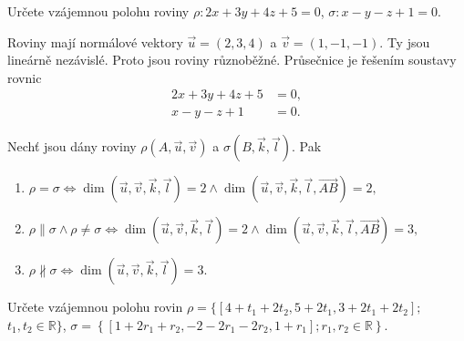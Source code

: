 \begin{priklad}
Určete vzájemnou polohu roviny $\rho\colon 2x+3y+4z+5=0$, $\sigma\colon x-y-z+1=0$.
\end{priklad}

\begin{reseni}
Roviny mají normálové vektory $\vec u = (2,3,4)$ a $\vec v = (1,-1,-1)$. Ty jsou lineárně nezávislé.
Proto jsou roviny různoběžné. Průsečnice je řešením soustavy rovnic
\begin{align*}
    2x+3y+4z+5& =0,\\
    x-y-z+1&=0.
\end{align*}
\end{reseni}

\begin{veta}
    Nechť jsou dány roviny $\rho(A,\vec u, \vec v)$ a $\sigma(B,\vec k, \vec l)$. Pak
    \begin{enumerate}[$i.$]
    \item $\rho = \sigma \iff \dim (\vec u, \vec v, \vec k, \vec l) = 2 \land \dim (\vec u, \vec v, \vec k, \vec l, \overrightarrow{AB})=2,$
   	\item $\rho \parallel \sigma \land \rho \ne \sigma \iff \dim (\vec u, \vec v, \vec k, \vec l) = 2 \land \dim (\vec u, \vec v, \vec k, \vec l, \overrightarrow{AB})=3,$
   	\item $\rho \nparallel \sigma \iff \dim (\vec u, \vec v, \vec k, \vec l) = 3$.
    \end{enumerate}
\end{veta}

\begin{priklad}
Určete vzájemnou polohu rovin $\rho = \{ [4+t_1+2t_2,5+2t_1,3+2t_1+2t_2];$ $t_1,t_2\in \mathbb R \}$,
$\sigma = \left \{ [1+2r_1+r_2,-2-2r_1-2r_2,1+r_1]; r_1,r_2\in \mathbb R \right \}. $
\end{priklad}

